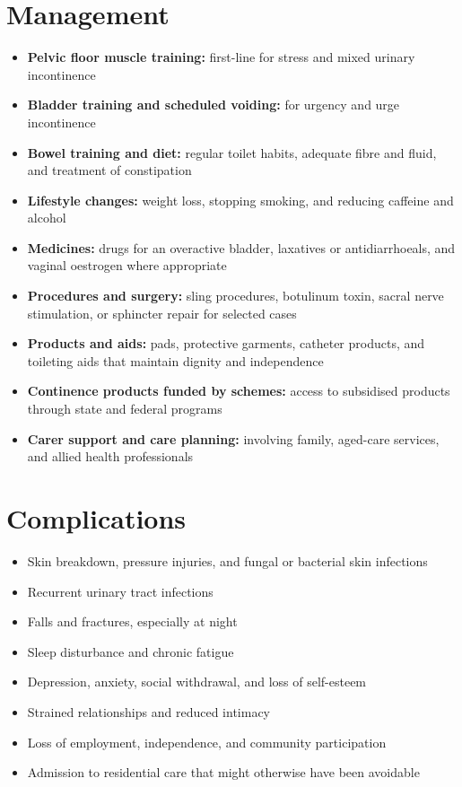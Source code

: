 \section*{Management}
\begin{itemize}
    \item \textbf{Pelvic floor muscle training:} first-line for stress and mixed urinary incontinence
    \item \textbf{Bladder training and scheduled voiding:} for urgency and urge incontinence
    \item \textbf{Bowel training and diet:} regular toilet habits, adequate fibre and fluid, and treatment of constipation
    \item \textbf{Lifestyle changes:} weight loss, stopping smoking, and reducing caffeine and alcohol
    \item \textbf{Medicines:} drugs for an overactive bladder, laxatives or antidiarrhoeals, and vaginal oestrogen where appropriate
    \item \textbf{Procedures and surgery:} sling procedures, botulinum toxin, sacral nerve stimulation, or sphincter repair for selected cases
    \item \textbf{Products and aids:} pads, protective garments, catheter products, and toileting aids that maintain dignity and independence
    \item \textbf{Continence products funded by schemes:} access to subsidised products through state and federal programs
    \item \textbf{Carer support and care planning:} involving family, aged-care services, and allied health professionals
\end{itemize}

\section*{Complications}
\begin{itemize}
    \item Skin breakdown, pressure injuries, and fungal or bacterial skin infections
    \item Recurrent urinary tract infections
    \item Falls and fractures, especially at night
    \item Sleep disturbance and chronic fatigue
    \item Depression, anxiety, social withdrawal, and loss of self-esteem
    \item Strained relationships and reduced intimacy
    \item Loss of employment, independence, and community participation
    \item Admission to residential care that might otherwise have been avoidable
\end{itemize}


